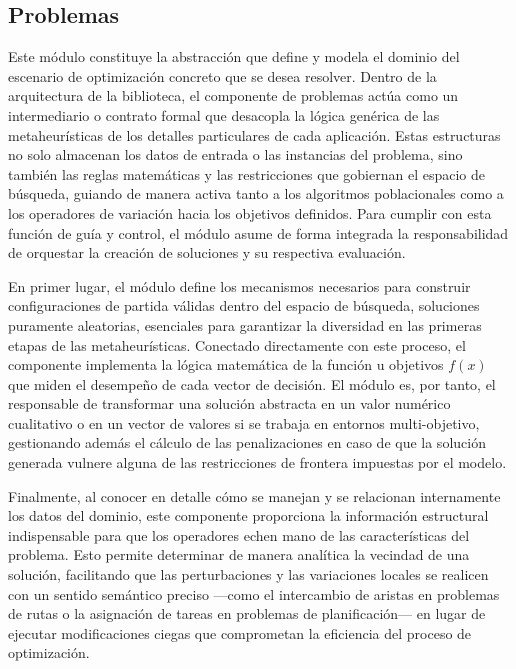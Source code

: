 \documentclass[12pt,a4paper,twoside,openright]{book}
\begin{document}
    

    \subsection{Problemas}
        Este módulo constituye la abstracción que define y modela el dominio del escenario de optimización concreto que se desea resolver. Dentro de la arquitectura de la biblioteca, el componente de problemas actúa como un intermediario o contrato formal que desacopla la lógica genérica de las metaheurísticas de los detalles particulares de cada aplicación. Estas estructuras no solo almacenan los datos de entrada o las instancias del problema, sino también las reglas matemáticas y las restricciones que gobiernan el espacio de búsqueda, guiando de manera activa tanto a los algoritmos poblacionales como a los operadores de variación hacia los objetivos definidos. Para cumplir con esta función de guía y control, el módulo asume de forma integrada la responsabilidad de orquestar la creación de soluciones y su respectiva evaluación.
        
        En primer lugar, el módulo define los mecanismos necesarios para construir configuraciones de partida válidas dentro del espacio de búsqueda, soluciones puramente aleatorias, esenciales para garantizar la diversidad en las primeras etapas de las metaheurísticas. Conectado directamente con este proceso, el componente implementa la lógica matemática de la función u objetivos $f(x)$ que miden el desempeño de cada vector de decisión. El módulo es, por tanto, el responsable de transformar una solución abstracta en un valor numérico cualitativo o en un vector de valores si se trabaja en entornos multi-objetivo, gestionando además el cálculo de las penalizaciones en caso de que la solución generada vulnere alguna de las restricciones de frontera impuestas por el modelo.
        
        Finalmente, al conocer en detalle cómo se manejan y se relacionan internamente los datos del dominio, este componente proporciona la información estructural indispensable para que los operadores echen mano de las características del problema. Esto permite determinar de manera analítica la vecindad de una solución, facilitando que las perturbaciones y las variaciones locales se realicen con un sentido semántico preciso —como el intercambio de aristas en problemas de rutas o la asignación de tareas en problemas de planificación— en lugar de ejecutar modificaciones ciegas que comprometan la eficiencia del proceso de optimización.
\end{document}
